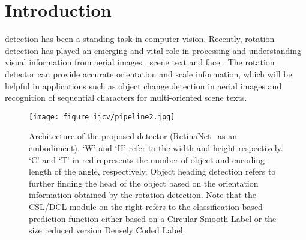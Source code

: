 \documentclass[10pt,journal,compsoc]{IEEEtran}
\begin{document}
	\section{Introduction}
	 detection has been a standing task in computer vision. Recently, rotation detection has played an emerging and vital role in processing and understanding visual information from aerial images \cite{yang2021r3det, ding2018learning, yang2019scrdet, azimi2018towards, yang2018automatic}, scene text \cite{zhou2017east, liu2018fots, jiang2017r2cnn, ma2018arbitrary, liao2018rotation, liao2018textboxes++} and face \cite{shi2018real, huang2007high, rowley1998rotation}. The rotation detector can provide accurate orientation and scale information, which will be helpful in applications such as object change detection in aerial images and recognition of sequential characters for multi-oriented scene texts.
	
	\begin{figure*}[!tb]
	\centering
	\texttt{[image: figure\_ijcv/pipeline2.jpg]}
	\caption{Architecture of the proposed detector (RetinaNet~\cite{lin2017focal} as an embodiment). `W' and `H' refer to the width and height respectively. `C' and `T' in red represents the number of object and encoding length of the angle, respectively. Object heading detection refers to further finding the head of the object based on the orientation information obtained by the rotation detection. Note that the CSL/DCL module on the right refers to the classification based prediction function either based on a Circular Smooth Label or the size reduced version Densely Coded Label.}
	\label{fig:pipeline}
	\vspace{-10pt}
\end{figure*}
\end{document}
